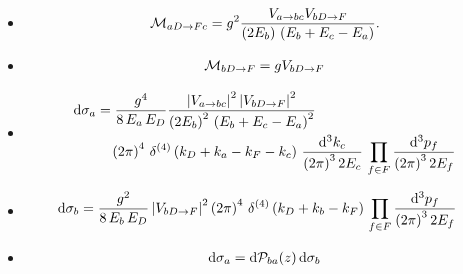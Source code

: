 \begin{subappendices}
\begin{itemize}
    \item
        \begin{align}
            \mathcal{M}_{a D \to F c}
            =
            g^2
            \frac{
                V_{a \to b c} V_{b D \to F}
            }
            {
                \left(2 E_b\right)
                \,
                \left(E_b + E_c - E_a\right)
            }
            .
        \end{align}

    \item
        \begin{align}
            \mathcal{M}_{b D \to F}
            =
            g V_{b D \to F}
        \end{align}

    \item
        \begin{align}
            \dd \sigma_a
            &=
            \frac{g^4}{8\,E_a\,E_D}
            \frac{
                \left| V_{a \to b c} \right|^2
                \left| V_{b D \to F} \right|^2
            }
            {
                \left(2 E_b\right)^2
                \,
                \left(E_b + E_c - E_a\right)^2
            }
            \\
            \notag&\quad
            \left(2 \pi\right)^4
            \,
            \delta^{(4)}\left(k_D + k_a - k_F - k_c\right)
            \,
            \frac{\dd^3 k_c}{\left(2\pi\right)^3 2 E_c}
            \,
            \prod_{f \in F}
            \frac{\dd^3 p_f}{\left(2\pi\right)^3 2 E_f}
        \end{align}

    \item
        \begin{align}
            \dd \sigma_b
            &=
            \frac{g^2}{8\,E_b\,E_D}
            \left| V_{b D \to F} \right|^2
            \left(2 \pi\right)^4
            \,
            \delta^{(4)}\left(k_D + k_b - k_F\right)
            \,
            \prod_{f \in F}
            \frac{\dd^3 p_f}{\left(2\pi\right)^3 2 E_f}
        \end{align}

    \item
        \begin{align}
            \dd \sigma_a
            =
            \dd \mathcal{P}_{ba}(z)
            \,
            \dd \sigma_b
        \end{align}


\end{itemize}
\end{subappendices}
